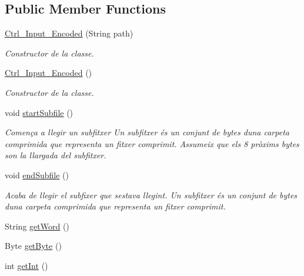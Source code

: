 \subsection*{Public Member Functions}
\begin{DoxyCompactItemize}
\item 
\hyperlink{classpersistencia_1_1input_1_1Ctrl__Input__Encoded_acabdf37054fa432d54000d7bf383aa20}{Ctrl\+\_\+\+Input\+\_\+\+Encoded} (String path)
\begin{DoxyCompactList}\small\item\em Constructor de la classe. \end{DoxyCompactList}\item 
\hyperlink{classpersistencia_1_1input_1_1Ctrl__Input__Encoded_a393b9c1ed55f9d46669f2c50db948cc5}{Ctrl\+\_\+\+Input\+\_\+\+Encoded} ()
\begin{DoxyCompactList}\small\item\em Constructor de la classe. \end{DoxyCompactList}\item 
void \hyperlink{classpersistencia_1_1input_1_1Ctrl__Input__Encoded_ababb8ac0798194f61c4a77d1ddf5947e}{start\+Subfile} ()
\begin{DoxyCompactList}\small\item\em Comença a llegir un subfitxer Un subfitxer és un conjunt de bytes d\textquotesingle{}una carpeta comprimida que representa un fitxer comprimit. Assumeix que els 8 pròxims bytes son la llargada del subfitxer. \end{DoxyCompactList}\item 
void \hyperlink{classpersistencia_1_1input_1_1Ctrl__Input__Encoded_a180970a90ac6d386472e5959f7cf3f9b}{end\+Subfile} ()
\begin{DoxyCompactList}\small\item\em Acaba de llegir el subfixer que s\textquotesingle{}estava llegint. Un subfitxer és un conjunt de bytes d\textquotesingle{}una carpeta comprimida que representa un fitxer comprimit. \end{DoxyCompactList}\item 
String \hyperlink{classpersistencia_1_1input_1_1Ctrl__Input__Encoded_a87ebc4b52c5884ba9c397558668e67d7}{get\+Word} ()
\item 
Byte \hyperlink{classpersistencia_1_1input_1_1Ctrl__Input__Encoded_a38ede6bc49251e77ae4be30ccc06457d}{get\+Byte} ()
\item 
int \hyperlink{classpersistencia_1_1input_1_1Ctrl__Input__Encoded_aed32b42778121e7e55d8338d9eaaddb9}{get\+Int} ()
\end{DoxyCompactItemize}
